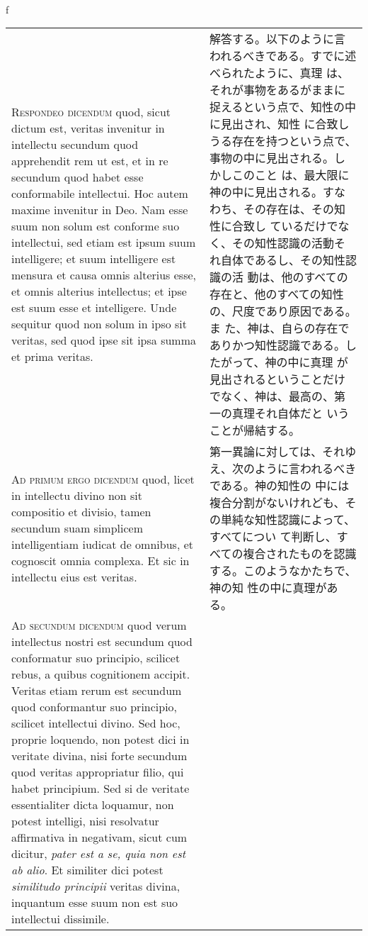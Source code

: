 \\f\documentclass[10pt]{jsarticle} %
\begin{document}
\begin{longtable}{p{21em}p{21em}}
\\

{\scshape Respondeo dicendum} quod, sicut dictum est, veritas
 invenitur in intellectu secundum quod apprehendit rem ut est, et in
 re secundum quod habet esse conformabile intellectui. Hoc autem
 maxime invenitur in Deo. Nam esse suum non solum est conforme suo
 intellectui, sed etiam est ipsum suum intelligere; et suum
 intelligere est mensura et causa omnis alterius esse, et omnis
 alterius intellectus; et ipse est suum esse et intelligere. Unde
 sequitur quod non solum in ipso sit veritas, sed quod ipse sit ipsa
 summa et prima veritas.

&

解答する。以下のように言われるべきである。すでに述べられたように、真理
は、それが事物をあるがままに捉えるという点で、知性の中に見出され、知性
に合致しうる存在を持つという点で、事物の中に見出される。しかしこのこと
は、最大限に神の中に見出される。すなわち、その存在は、その知性に合致し
ているだけでなく、その知性認識の活動それ自体であるし、その知性認識の活
動は、他のすべての存在と、他のすべての知性の、尺度であり原因である。ま
た、神は、自らの存在でありかつ知性認識である。したがって、神の中に真理
が見出されるということだけでなく、神は、最高の、第一の真理それ自体だと
いうことが帰結する。

\\

{\scshape Ad primum ergo dicendum} quod, licet in intellectu divino
 non sit compositio et divisio, tamen secundum suam simplicem
 intelligentiam iudicat de omnibus, et cognoscit omnia complexa. Et
 sic in intellectu eius est veritas.

&

第一異論に対しては、それゆえ、次のように言われるべきである。神の知性の
中には複合分割がないけれども、その単純な知性認識によって、すべてについ
て判断し、すべての複合されたものを認識する。このようなかたちで、神の知
性の中に真理がある。

\\

{\scshape Ad secundum dicendum} quod verum intellectus nostri est
 secundum quod conformatur suo principio, scilicet rebus, a quibus
 cognitionem accipit. Veritas etiam rerum est secundum quod
 conformantur suo principio, scilicet intellectui divino. Sed hoc,
 proprie loquendo, non potest dici in veritate divina, nisi forte
 secundum quod veritas appropriatur filio, qui habet principium. Sed
 si de veritate essentialiter dicta loquamur, non potest intelligi,
 nisi resolvatur affirmativa in negativam, sicut cum dicitur,
 {\itshape pater est a se, quia non est ab alio}. Et similiter dici
 potest {\itshape similitudo principii} veritas divina, inquantum esse
 suum non est suo intellectui dissimile.


\end{longtable}
\end{document}
